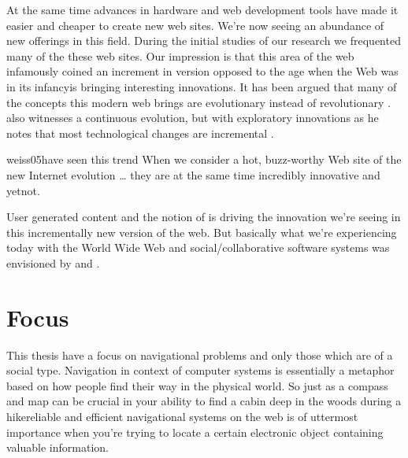 At the same time advances in hardware and web development tools have made it
easier and cheaper to create new web sites. We're now seeing an
abundance of new offerings in this field.
During the initial studies of our research we frequented
many of the these web sites. Our impression is that
this area of the web infamously coined \dash{}an
increment in version opposed to the age when the Web was in its
infancy\dash{}is bringing interesting innovations.
It has been argued that many of the concepts this modern web brings are
evolutionary instead of revolutionary \citep[]{yakovlev07}.
\citet[]{treese06} also witnesses a continuous evolution, but with
exploratory innovations as he notes that most technological changes are
incremental%
.
\begin{fullquote}[\p{18}]{weiss05}{have seen this trend}
  When we consider a hot, buzz-worthy Web site of the new Internet evolution
  \ldots
  they are at the same time incredibly innovative and yet\dash{}not.
\end{fullquote}

User generated content and the notion of %
is driving the innovation we're seeing in this incrementally new version of
the web. But basically what we're experiencing today with the World Wide Web
and social/collaborative software systems was envisioned by
\citet{licklider68} and
\citet{bush45}.

\section{Focus}

This thesis have a focus on navigational problems and only those
which are of a social type.%
Navigation in context of computer systems is
essentially a metaphor based on how people find their way in the physical
world. So just as a compass and map can be crucial in your ability to find a
cabin deep in the woods during a hike\dash{}reliable and efficient
navigational systems on the web is of uttermost importance when you're trying
to locate a certain electronic object containing valuable information.

